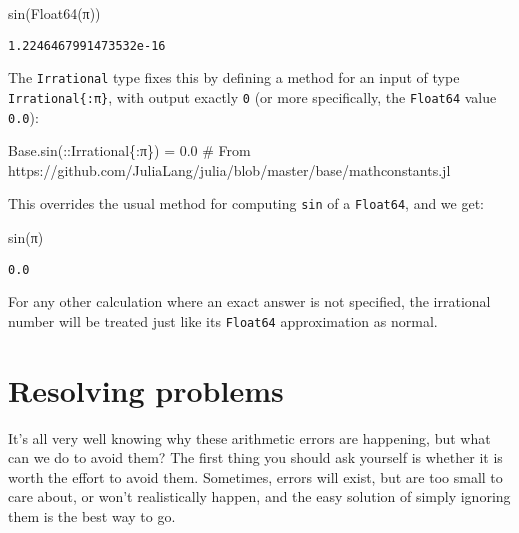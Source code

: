 \documentclass[
  letterpaper,
  DIV=11,
  numbers=noendperiod]{scrreprt}
\newenvironment{Shaded}{\begin{snugshade}}{\end{snugshade}}
\newcommand{\BuiltInTok}[1]{\textcolor[rgb]{0.00,0.23,0.31}{#1}}
\newcommand{\CommentTok}[1]{\textcolor[rgb]{0.37,0.37,0.37}{#1}}
\newcommand{\ConstantTok}[1]{\textcolor[rgb]{0.56,0.35,0.01}{#1}}
\newcommand{\DataTypeTok}[1]{\textcolor[rgb]{0.68,0.00,0.00}{#1}}
\newcommand{\FloatTok}[1]{\textcolor[rgb]{0.68,0.00,0.00}{#1}}
\newcommand{\FunctionTok}[1]{\textcolor[rgb]{0.28,0.35,0.67}{#1}}
\newcommand{\NormalTok}[1]{\textcolor[rgb]{0.00,0.23,0.31}{#1}}
\newcommand{\OperatorTok}[1]{\textcolor[rgb]{0.37,0.37,0.37}{#1}}
\begin{document}
\begin{Shaded}
\begin{Highlighting}[]
\FunctionTok{sin}\NormalTok{(}\FunctionTok{Float64}\NormalTok{(}\ConstantTok{π}\NormalTok{))}
\end{Highlighting}
\end{Shaded}

\begin{verbatim}
1.2246467991473532e-16
\end{verbatim}

The \texttt{Irrational} type fixes this by defining a method for an
input of type \texttt{Irrational\{:π\}}, with output exactly \texttt{0}
(or more specifically, the \texttt{Float64} value \texttt{0.0}):

\begin{Shaded}
\begin{Highlighting}[]
\BuiltInTok{Base}\NormalTok{.}\FunctionTok{sin}\NormalTok{(}\OperatorTok{::}\DataTypeTok{Irrational\{:π\}}\NormalTok{) }\OperatorTok{=} \FloatTok{0.0} \CommentTok{\# From https://github.com/JuliaLang/julia/blob/master/base/mathconstants.jl}
\end{Highlighting}
\end{Shaded}

This overrides the usual method for computing \texttt{sin} of a
\texttt{Float64}, and we get:

\begin{Shaded}
\begin{Highlighting}[]
\FunctionTok{sin}\NormalTok{(}\ConstantTok{π}\NormalTok{)}
\end{Highlighting}
\end{Shaded}

\begin{verbatim}
0.0
\end{verbatim}

For any other calculation where an exact answer is not specified, the
irrational number will be treated just like its \texttt{Float64}
approximation as normal.

\hypertarget{resolving-problems}{%
\section{Resolving problems}\label{resolving-problems}}

It's all very well knowing why these arithmetic errors are happening,
but what can we do to avoid them? The first thing you should ask
yourself is whether it is worth the effort to avoid them. Sometimes,
errors will exist, but are too small to care about, or won't
realistically happen, and the easy solution of simply ignoring them is
the best way to go.
\end{document}

